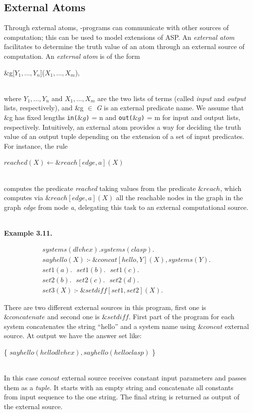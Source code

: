 \documentclass[14pt,a4paper, titlepage]{article}
\newcommand{\ext}[3]{\ensuremath{\&{#1}[#2](#3)}}
\DeclareMathOperator{\leftimpl}{:-}
\begin{document}
\subsection{External Atoms}
Through external atoms, \hex{}-programs can communicate with other sources of computation; this can be used to model extensions of ASP.  
An \emph{external atom} facilitates to determine the truth value of an atom through an external source of computation.
An \emph{external atom} is of the form \\ \centerline{ \&g[$Y_1,\dots,Y_n$]($X_1,\dots,X_m$),} \\where $Y_1,\dots,Y_n$ and $X_1,\dots,X_m$ are the two lists of terms (called \textit{input} and \textit{output} lists, respectively), and \&g $\in$ \textit{G} is an external predicate name. We assume that \&g has fixed lengths \texttt{in($\&g$)} = n and \texttt{out($\&g$)} = m for input and output lists, respectively. Intuitively, an external atom provides a way for deciding the truth value of an output tuple depending on the extension of a set of input predicates.
For instance, the rule \\ \centerline{ \textit{$reached(X) \leftarrow \&reach[edge,a](X)$}}
\\computes the predicate \textit{reached} taking values from the predicate $\&reach$, which computes via \textit{$\&reach[edge,a](X)$} all the reachable nodes in the graph in the graph \textit{edge} from node \textit{a}, delegating this task to an external computational source.

\textbf{\\Example 3.11.}

\begin{align*}
& \mathit{systems}(\mathit{dlvhex}). \mathit{systems}(\mathit{clasp}). \\  
& \mathit{sayhello(X)} \leftimpl \ext{\mathit{concat}}{\mathit{hello, Y}}{\mathit{X}}, \mathit{systems(Y).}  \\ 
& \mathit{set1}(a). \text{ } \mathit{set1}(b). \text{ } \mathit{set1}(c).\\
& \mathit{set2}(b). \text{ } \mathit{set2}(c). \text{ } \mathit{set2}(d).\\
& \mathit{set3}(X) \leftimpl \ext{\mathit{setdiff}}{\mathit{set1, set2}}{\mathit{X}}. 
&
\end{align*}

There are two different external sources in this program, first one is $\mathit{\&concatenate}$ and second one is $\mathit{\&setdiff}$. First part of the program for each system concatenates the string \enquote{hello} and a system name using $\mathit{\&concat}$ external source. At output we have the answer set like:\\ 
\centerline{ \{ $\mathit{sayhello}(\mathit{hellodlvhex}), \mathit{sayhello}(\mathit{helloclasp})$ \}}
\\In this case $\mathit{concat}$ external source receives constant input parameters and passes them as a \emph{tuple}. It starts with an empty string and concatenate all constants from input sequence to the one string. The final string is returned as output of the external source.   
\end{document}
